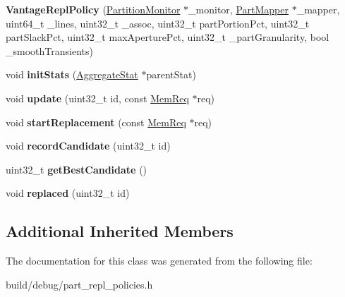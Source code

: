 \begin{DoxyCompactItemize}
\item 
\hypertarget{classVantageReplPolicy_ab2458a07dbcda64cbcc4e01a04b6fd4a}{{\bfseries Vantage\-Repl\-Policy} (\hyperlink{classPartitionMonitor}{Partition\-Monitor} $\ast$\-\_\-monitor, \hyperlink{classPartMapper}{Part\-Mapper} $\ast$\-\_\-mapper, uint64\-\_\-t \-\_\-lines, uint32\-\_\-t \-\_\-assoc, uint32\-\_\-t part\-Portion\-Pct, uint32\-\_\-t part\-Slack\-Pct, uint32\-\_\-t max\-Aperture\-Pct, uint32\-\_\-t \-\_\-part\-Granularity, bool \-\_\-smooth\-Transients)}\label{classVantageReplPolicy_ab2458a07dbcda64cbcc4e01a04b6fd4a}

\item 
\hypertarget{classVantageReplPolicy_a4ef29a79720b88885374af04e23d237c}{void {\bfseries init\-Stats} (\hyperlink{classAggregateStat}{Aggregate\-Stat} $\ast$parent\-Stat)}\label{classVantageReplPolicy_a4ef29a79720b88885374af04e23d237c}

\item 
\hypertarget{classVantageReplPolicy_a281d05b9d69bb6acf223cf06e326ec35}{void {\bfseries update} (uint32\-\_\-t id, const \hyperlink{structMemReq}{Mem\-Req} $\ast$req)}\label{classVantageReplPolicy_a281d05b9d69bb6acf223cf06e326ec35}

\item 
\hypertarget{classVantageReplPolicy_ab5c16020ae5ad77478facd28c9c10d0e}{void {\bfseries start\-Replacement} (const \hyperlink{structMemReq}{Mem\-Req} $\ast$req)}\label{classVantageReplPolicy_ab5c16020ae5ad77478facd28c9c10d0e}

\item 
\hypertarget{classVantageReplPolicy_a0ca714989c8e4f7f1cb2d8ebcd37f6b8}{void {\bfseries record\-Candidate} (uint32\-\_\-t id)}\label{classVantageReplPolicy_a0ca714989c8e4f7f1cb2d8ebcd37f6b8}

\item 
\hypertarget{classVantageReplPolicy_abb51e687eba9ea5a7d05313b92a48dd1}{uint32\-\_\-t {\bfseries get\-Best\-Candidate} ()}\label{classVantageReplPolicy_abb51e687eba9ea5a7d05313b92a48dd1}

\item 
\hypertarget{classVantageReplPolicy_a40be15cb18b2145b7dae15b157b519c0}{void {\bfseries replaced} (uint32\-\_\-t id)}\label{classVantageReplPolicy_a40be15cb18b2145b7dae15b157b519c0}

\end{DoxyCompactItemize}
\subsection*{Additional Inherited Members}


The documentation for this class was generated from the following file\-:\begin{DoxyCompactItemize}
\item 
build/debug/part\-\_\-repl\-\_\-policies.\-h\end{DoxyCompactItemize}
